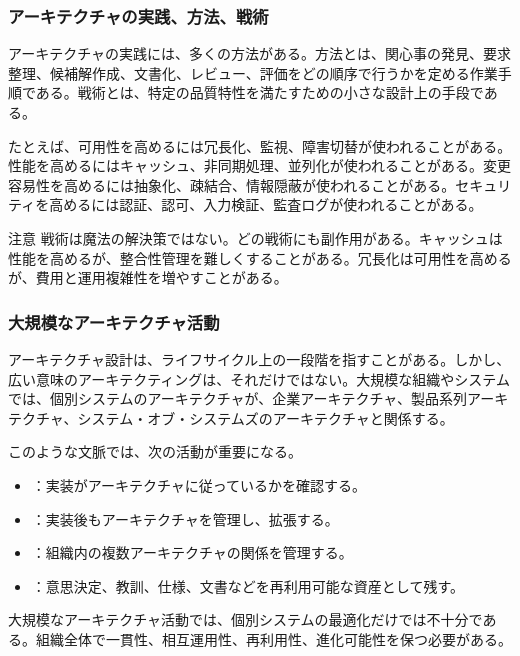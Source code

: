 \subsubsection{アーキテクチャの実践、方法、戦術}
アーキテクチャの実践には、多くの方法がある。方法とは、関心事の発見、要求整理、候補解作成、文書化、レビュー、評価をどの順序で行うかを定める作業手順である。戦術とは、特定の品質特性を満たすための小さな設計上の手段である。

たとえば、可用性を高めるには冗長化、監視、障害切替が使われることがある。性能を高めるにはキャッシュ、非同期処理、並列化が使われることがある。変更容易性を高めるには抽象化、疎結合、情報隠蔽が使われることがある。セキュリティを高めるには認証、認可、入力検証、監査ログが使われることがある。

\begin{statementbox}{注意}
戦術は魔法の解決策ではない。どの戦術にも副作用がある。キャッシュは性能を高めるが、整合性管理を難しくすることがある。冗長化は可用性を高めるが、費用と運用複雑性を増やすことがある。
\end{statementbox}

\subsubsection{大規模なアーキテクチャ活動}
アーキテクチャ設計は、ライフサイクル上の一段階を指すことがある。しかし、広い意味のアーキテクティングは、それだけではない。大規模な組織やシステムでは、個別システムのアーキテクチャが、企業アーキテクチャ、製品系列アーキテクチャ、システム・オブ・システムズのアーキテクチャと関係する。

このような文脈では、次の活動が重要になる。
\begin{itemize}
  \item {}：実装がアーキテクチャに従っているかを確認する。
  \item {}：実装後もアーキテクチャを管理し、拡張する。
  \item {}：組織内の複数アーキテクチャの関係を管理する。
  \item {}：意思決定、教訓、仕様、文書などを再利用可能な資産として残す。
\end{itemize}

大規模なアーキテクチャ活動では、個別システムの最適化だけでは不十分である。組織全体で一貫性、相互運用性、再利用性、進化可能性を保つ必要がある。
